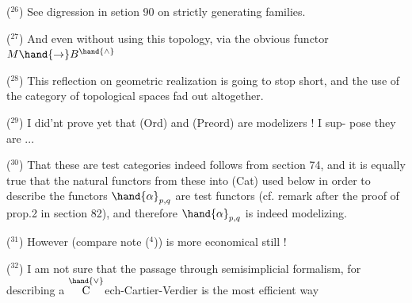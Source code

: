 ($^{26}$) See digression in setion 90 on strictly generating families.

($^{27}$) And even without using this topology,  via the obvious functor
$M \hand{\to} B^{\hand{\wedge}}$ \hand{!}

($^{28}$) This reflection on geometric realization is going to stop short,
and the use of the category of topological spaces  fad out altogether.

($^{29}$) I did'nt prove yet that (Ord) and (Preord) are modelizers !  I sup-%
pose they are ...

($^{30}$) That these are test categories indeed follows from section 74,
and it is equally true that the natural functors from these into (Cat)
\hand{(}used below in order to describe the functors $\hand{\ensuremath{\alpha}}_{p,q}$\hand{)} are test functors
(cf. remark after the proof of prop.2 in section 82),  and therefore
$\hand{\ensuremath{\alpha}}_{p,q}$ is indeed modelizing.

($^{31}$) However  (compare note ($^4$)) is more economical still !

($^{32}$) I am not sure that the passage through semisimplicial formalism,
for describing a $\overset{\hand{\vee}}{\mathrm{C}}$ech-Cartier-Verdier \hand{,} is the most efficient way\hand{,}

